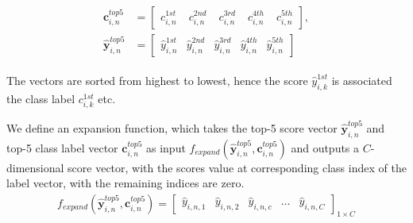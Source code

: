 \begin{align}
\begin{split}
\mathbf{c}_{i,n}^{top5} &= \begin{bmatrix}
c_{i,n}^{1st} & \phantom{.}c_{i,n}^{2nd} & \phantom{.}c_{i,n}^{3rd} & \phantom{.}c_{i,n}^{4th} & \phantom{.}c_{i,n}^{5th}
\end{bmatrix}, \\
\mathbf{\hat{y}}^{top5}_{i,n} &= \begin{bmatrix}
\hat{y}_{i,n}^{1st} & \hat{y}_{i,n}^{2nd} & \hat{y}_{i,n}^{3rd} & \hat{y}_{i,n}^{4th} & \hat{y}_{i,n}^{5th}
\end{bmatrix}
\end{split}
\end{align}

The vectors are sorted from highest to lowest, hence the score $ \hat{y}_{i,k}^{1st} $ is associated the class label $ c_{i,k}^{1st} $ etc. 

We define an expansion function, which takes the top-5 score vector $ \mathbf{\hat{y}}_{i,n}^{top5}$ and top-5 class label vector  $\mathbf{c}_{i,n}^{top5}$ as input  $ f_{expand}\left(\bm{\hat{y}}_{i,n}^{top5},\mathbf{c}_{i,n}^{top5}\right) $ and outputs a $ C $-dimensional score vector, with the scores value at corresponding class index of the label vector, with the remaining indices are zero.
\begin{align}
f_{expand}\left(\bm{\hat{y}}_{i,n}^{top5},\mathbf{c}_{i,n}^{top5}\right) = 
\begin{bmatrix}
\hat{y}_{i,n,1} & \hat{y}_{i,n,2} & \hat{y}_{i,n,c} & \dots & \hat{y}_{i,n,C}
\end{bmatrix}_{1 \times C}
\end{align}


